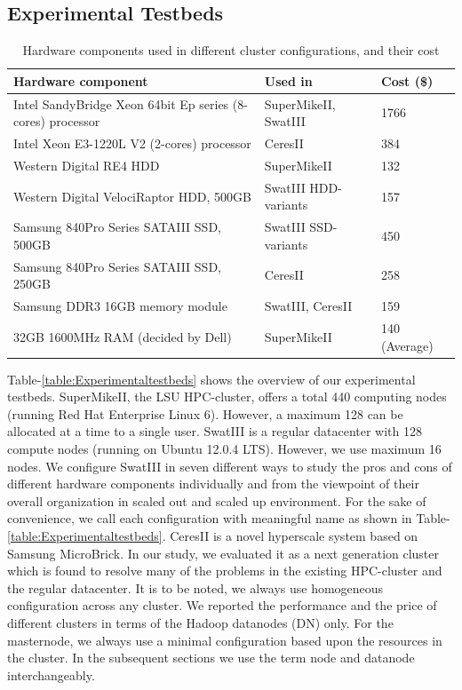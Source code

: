 \documentclass[conference]{IEEEtran}
\begin{document}
\subsection {Experimental Testbeds}
\begin{table}
	\begin{tabular}{ |p{4.4cm} |p{1.6cm} |p{1.6cm} |} \hline
		Hardware component & Used in & Cost (\$)\\ \hline
		Intel SandyBridge Xeon 64bit Ep series (8-cores) processor & SuperMikeII, SwatIII & 1766\\ \hline
		Intel Xeon E3-1220L V2 (2-cores) processor& CeresII & 384\\ \hline
		Western Digital RE4 HDD & SuperMikeII & 132\\ \hline
		Western Digital VelociRaptor HDD, 500GB & SwatIII HDD-variants & 157 \\ \hline
		Samsung 840Pro Series SATAIII SSD, 500GB & SwatIII SSD-variants & 450\\ \hline
		Samsung 840Pro Series SATAIII SSD, 250GB & CeresII & 258\\ \hline
		Samsung DDR3 16GB memory module & SwatIII, CeresII & 159\\ \hline
		32GB 1600MHz RAM (decided by Dell) & SuperMikeII  & 140 (Average)\\ \hline
	\end{tabular}
	\caption{Hardware components used in different cluster configurations, and their cost}
	\label{table:PriceOfEachComponent}
\vspace{-2.3em}
\end{table}
Table-\ref{table:Experimentaltestbeds} shows the overview of our experimental testbeds. SuperMikeII, the LSU HPC-cluster, offers a total 440 computing nodes (running Red Hat Enterprise Linux 6). However, a maximum 128 can be allocated at a time to a single user. SwatIII is a regular datacenter with 128 compute nodes (running on Ubuntu 12.0.4 LTS). However, we use maximum 16 nodes. We configure SwatIII in seven different ways to study the pros and cons of different hardware components individually and from the viewpoint of their overall organization in scaled out and scaled up environment. For the sake of convenience, we call each configuration with meaningful name as shown in Table-\ref{table:Experimentaltestbeds}. CeresII is a novel hyperscale system based on Samsung MicroBrick. In our study, we evaluated it as a next generation cluster which is found to resolve many of the problems in the existing HPC-cluster and the regular datacenter. It is to be noted, we always use homogeneous configuration across any cluster. We reported the performance and the price of different clusters in terms of the Hadoop datanodes (DN) only. For the masternode, we always use a minimal configuration based upon the resources in the cluster. In the subsequent sections we use the term node and datanode interchangeably.
\end{document}
